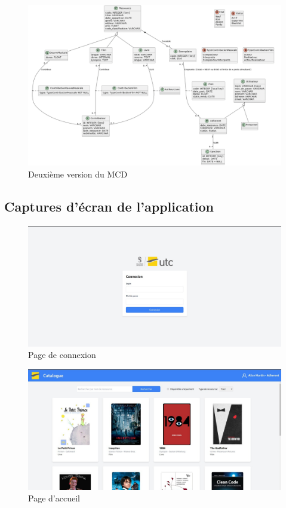 \documentclass{report-UTC}
\begin{document}
\begin{figure}[H]
\centering
\includegraphics[width=15cm]{../Rendu2/mcdV2.png}
\caption{Deuxième version du MCD}
\end{figure}

\subsection{Captures d'écran de l'application}

\begin{figure}[H]
\centering
\includegraphics[width=15cm]{./images/login.jpeg}
\caption{Page de connexion}
\end{figure}

\begin{figure}[H]
\centering
\includegraphics[width=15cm]{./images/dashboard.jpeg}
\caption{Page d'accueil}
\end{figure}
\end{document}
